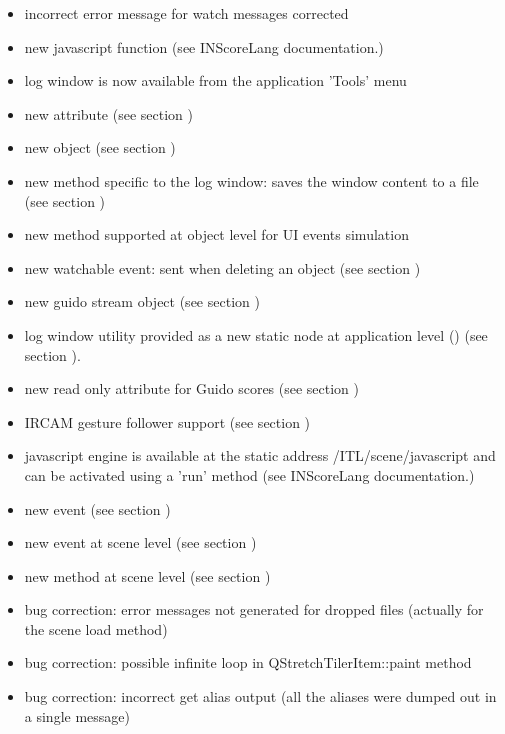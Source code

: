 \begin{itemize}
\item incorrect error message for watch messages corrected
\item new javascript  function (see INScoreLang documentation.)
\item log window is now available from the application 'Tools' menu
\item new  attribute (see section )
\item new  object (see section )
\item new  method specific to the log window: saves the window content to a file (see section )
\item new  method supported at object level for UI events simulation
\item new  watchable event: sent when deleting an object (see section )
\item new  guido stream object (see section )
\end{itemize}

\begin{itemize}
\item log window utility provided as a new static node at application level () (see section ).
\item new  read only attribute for Guido scores (see section )
\item IRCAM gesture follower support (see section )
\item javascript engine is available at the static address /ITL/scene/javascript and can be activated using a 'run' method  (see INScoreLang documentation.)
\item new  event (see section )
\item new  event at scene level  (see section )
\item new  method at scene level (see section )
\item bug correction: error messages not generated for dropped files (actually for the scene load method)
\item bug correction: possible infinite loop in QStretchTilerItem::paint method
\item bug correction: incorrect get alias output (all the aliases were dumped out in a single message)
\end{itemize}

